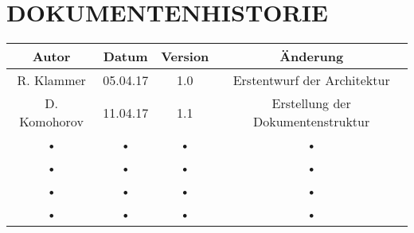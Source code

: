 \documentclass[12pt,a4paper,bibliography=totocnumbered,listof=totocnumbered]{scrartcl}
\begin{document}
\section*{DOKUMENTENHISTORIE}
\begin{tabular}{|c|c|c|c|}
\hline 
Autor & Datum & Version & Änderung \\ 
\hline 
R. Klammer & 05.04.17 & 1.0 & Erstentwurf der Architektur\\ 
\hline 
D. Komohorov & 11.04.17 & 1.1 & Erstellung der Dokumentenstruktur\\
\hline 
• & • & • & •\\
\hline 
• & • & • & •\\
\hline 
• & • & • & •\\
\hline 
• & • & • & •\\
\hline
\end{tabular} 
\pagebreak
\setcounter{page}{1}
\renewcommand{\cfttabpresnum}{Tab. }
\renewcommand{\cftfigpresnum}{Abb. }
\settowidth{\cfttabnumwidth}{Abb. 10\quad}
\settowidth{\cftfignumwidth}{Abb. 10\quad}

\singlespacing
{}
\renewcommand{\contentsname}{I Inhaltsverzeichnis}
{}
\addtocounter{section}{1}
\tableofcontents
\pagebreak

%


\end{document}
